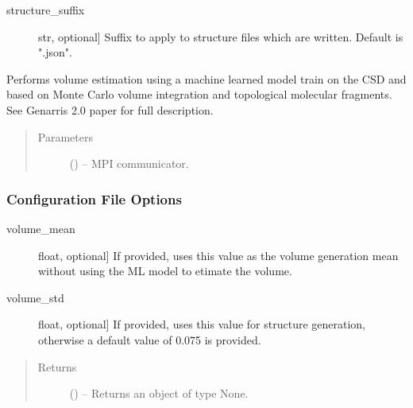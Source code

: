 \documentclass[letterpaper,10pt,english]{sphinxmanual}
\begin{document}
\begin{fulllineitems}
\begin{fulllineitems}
\begin{description}
\item[{structure\_suffix}] \leavevmode{[}str, optional{]}
Suffix to apply to structure files which are written.
Default is ".json".

\end{description}

\end{fulllineitems}


\begin{fulllineitems}
\label{\detokenize{index:Genarris.genarris_master.Genarris.Estimate_Unit_Cell_Volume}}
Performs volume estimation using a machine learned model train on the
CSD and based on Monte Carlo volume integration and topological
molecular fragments. See Genarris 2.0 paper for full description.
\begin{quote}\begin{description}
\item[{Parameters}] \leavevmode
{} () -- MPI communicator.

\end{description}\end{quote}
\subsubsection*{Configuration File Options}
\begin{description}
\item[{volume\_mean}] \leavevmode{[}float, optional{]}
If provided, uses this value as the volume generation mean without
using the ML model to etimate the volume.

\item[{volume\_std}] \leavevmode{[}float, optional{]}
If provided, uses this value for structure generation, otherwise
a default value of 0.075 is provided.

\end{description}
\begin{quote}\begin{description}
\item[{Returns}] \leavevmode
{} () -- Returns an object of type None.


\end{description}
\end{quote}
\end{fulllineitems}
\end{fulllineitems}
\end{document}
